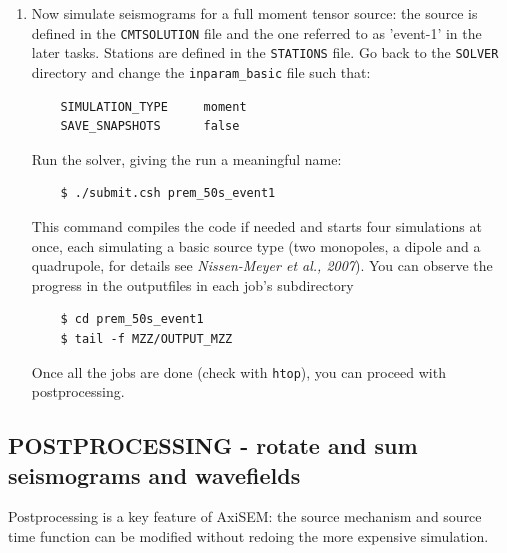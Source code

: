 \documentclass{article}
\begin{document}
\begin{enumerate}
    \item Now simulate seismograms for a full moment tensor source: the source is defined
    in the \verb|CMTSOLUTION| file and the one referred to as 'event-1' in the later tasks.
    Stations are defined in the \verb|STATIONS| file. Go back to the \verb|SOLVER|
    directory and change the \verb|inparam_basic| file such that:
    \begin{verbatim}
    SIMULATION_TYPE     moment
    SAVE_SNAPSHOTS      false
    \end{verbatim}
    Run the solver, giving the run a meaningful name:
    \begin{verbatim}
    $ ./submit.csh prem_50s_event1
    \end{verbatim}
    This command compiles the code if needed and starts four simulations at once, each
    simulating a basic source type (two monopoles, a dipole and a quadrupole, for details
    see \textit{Nissen-Meyer et al., 2007}). You can observe the progress in the outputfiles in
    each job's subdirectory
    \begin{verbatim}
    $ cd prem_50s_event1
    $ tail -f MZZ/OUTPUT_MZZ
    \end{verbatim}
    Once all the jobs are done (check with \verb|htop|), you can proceed with
    postprocessing.
    
\end{enumerate}
    

\subsection{POSTPROCESSING - rotate and sum seismograms and wavefields}

Postprocessing is a key feature of AxiSEM: the source mechanism and source time function
can be modified without redoing the more expensive simulation.
\end{document}
